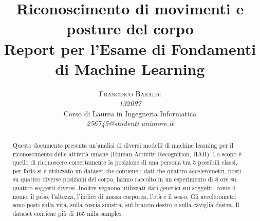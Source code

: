 \documentclass[10pt,a4paper]{article}
\begin{document}
\title{Riconoscimento di movimenti e posture del corpo \\
\Large{Report per l'Esame di Fondamenti di Machine Learning}
} %

\author{\textsc{Francesco Baraldi} \\
    \emph{132097} \\
    Corso di Laurea in Ingegneria Informatica\\
    \emph{256745@studenti.unimore.it}
  }

\date{}

\maketitle %

\begin{abstract}
\normalsize
Questo documento presenta un'analisi di diversi modelli di machine learning per il riconoscimento delle attività umane (Human Activity Recognition, HAR). Lo scopo è quello di riconoscere correttamente la posizione di una persona tra 5 possibili classi, per farlo si è utilizzato un dataset che contiene i dati che quattro accelerometri, posti su quattro diverse posizioni del corpo, hanno raccolto in un esperimento di 8 ore su quattro soggetti diversi. Inoltre vegnono utilizzati dati generici sui soggetti, come il nome, il peso, l'altezza, l'indice di massa corporea, l'età e il sesso. Gli accelerometri sono posti sulla vita, sulla coscia sinistra, sul braccio destro e sulla caviglia destra. Il dataset contiene più di 165 mila samples.

\end{abstract}








{}

\end{document}
